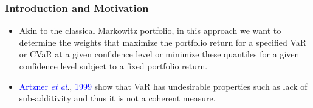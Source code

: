 \documentclass[pdf,9pt,xcolor=dvipsnames,hide notes]{beamer}
\begin{document}
\begin{frame}[label=frame1d]
	\frametitle{Introduction and Motivation}
	
	\begin{itemize}
		\justifying
		
		\item Akin to
				the classical Markowitz portfolio, in this approach we want to determine
				the weights that maximize the portfolio return for a specified VaR or CVaR
				at a given confidence level or minimize these quantiles for a given
				confidence level subject to a fixed portfolio return.
				
				\vspace{0.3cm}
				
				\item  \textcolor{blue}{Artzner \emph{et al}}., \textcolor{blue}{1999} show that VaR has undesirable properties such as lack
				of sub-additivity and thus it is not a coherent measure.
		
			\end{itemize}
	
\end{frame}
\end{document}
